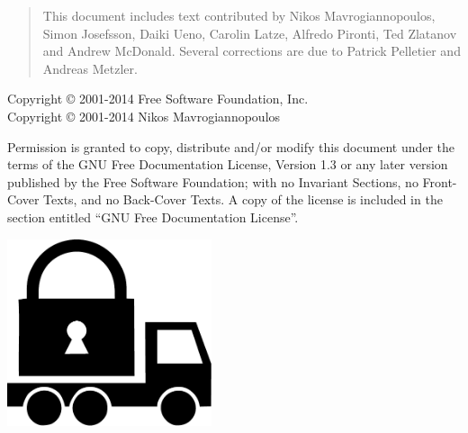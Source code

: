 \thispagestyle{empty}

\begin{quotation}
This document includes text contributed by
Nikos Mavrogiannopoulos, Simon Josefsson, Daiki Ueno, 
Carolin Latze, Alfredo Pironti, Ted Zlatanov and Andrew McDonald. Several corrections are due
to Patrick Pelletier and Andreas Metzler.
\end{quotation}



\begin{flushleft}
Copyright \copyright{} 2001-2014 Free Software Foundation, Inc.\\
Copyright \copyright{} 2001-2014 Nikos Mavrogiannopoulos
\end{flushleft}

\begin{flushleft}
Permission is granted to copy, distribute and/or modify this document
under the terms of the GNU Free Documentation License, Version 1.3 or
any later version published by the Free Software Foundation; with no
Invariant Sections, no Front-Cover Texts, and no Back-Cover Texts.  A
copy of the license is included in the section entitled ``GNU Free
Documentation License''.
\end{flushleft}

\newpage
\thispagestyle{empty}

\begin{center}
\includegraphics[width=6cm]{../gnutls-logo.pdf}
\end{center}

